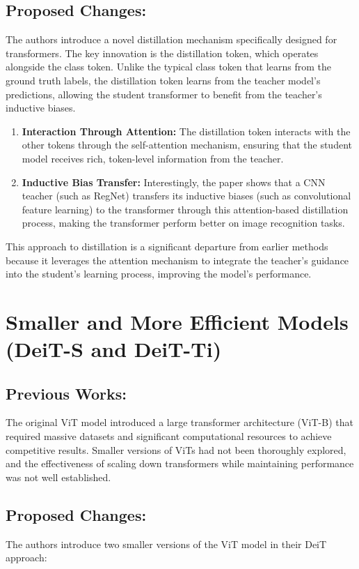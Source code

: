 \documentclass{report}
\begin{document}
	
	\subsection{Proposed Changes:}
	The authors introduce a novel distillation mechanism specifically designed for transformers. The key innovation is the distillation token, which operates alongside the class token. Unlike the typical class token that learns from the ground truth labels, the distillation token learns from the teacher model’s predictions, allowing the student transformer to benefit from the teacher's inductive biases.
	
	\begin{enumerate}
		\item 
		\textbf{Interaction Through Attention:} The distillation token interacts with the other tokens through the self-attention mechanism, ensuring that the student model receives rich, token-level information from the teacher.
		
		\item 
		\textbf{Inductive Bias Transfer:} Interestingly, the paper shows that a CNN teacher (such as RegNet) transfers its inductive biases (such as convolutional feature learning) to the transformer through this attention-based distillation process, making the transformer perform better on image recognition tasks.
	\end{enumerate}
	This approach to distillation is a significant departure from earlier methods because it leverages the attention mechanism to integrate the teacher's guidance into the student's learning process, improving the model's performance.
	
	
	
	\section{Smaller and More Efficient Models (DeiT-S and DeiT-Ti)}
	\subsection{Previous Works:}
	The original ViT model introduced a large transformer architecture (ViT-B) that required massive datasets and significant computational resources to achieve competitive results. Smaller versions of ViTs had not been thoroughly explored, and the effectiveness of scaling down transformers while maintaining performance was not well established.
	
	
	\subsection{Proposed Changes:}
	The authors introduce two smaller versions of the ViT model in their DeiT approach:
	
\end{document}
